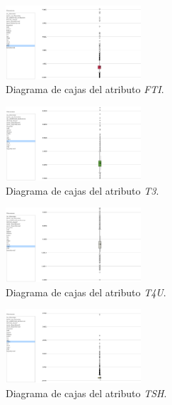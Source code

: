 \documentclass[osajnl,twocolumn,showpacs,superscriptaddress,10pt,floatfix]{revtex4-1} %
\begin{document}
\begin{figure}[H]
    \centering
    \includegraphics[width=0.45\textwidth]{analysis/box_plot_FTI}
    \caption{Diagrama de cajas del atributo \textit{FTI}.}
    \label{figure:box_plot_FTI}
\end{figure}

\begin{figure}[H]
    \centering
    \includegraphics[width=0.45\textwidth]{analysis/box_plot_T3}
    \caption{Diagrama de cajas del atributo \textit{T3}.}
    \label{figure:box_plot_T3}
\end{figure}

\begin{figure}[H]
    \centering
    \includegraphics[width=0.45\textwidth]{analysis/box_plot_T4U}
    \caption{Diagrama de cajas del atributo \textit{T4U}.}
    \label{figure:box_plot_T4U}
\end{figure}

\begin{figure}[H]
    \centering
    \includegraphics[width=0.45\textwidth]{analysis/box_plot_TSH}
    \caption{Diagrama de cajas del atributo \textit{TSH}.}
    \label{figure:box_plot_TSH}
\end{figure}
\end{document}
